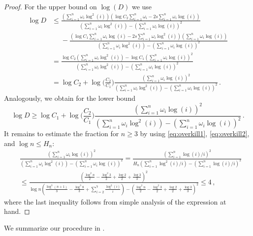 \documentclass[a4paper]{scrartcl}
\numberwithin{equation}{section}
\begin{document}
\begin{proof}
    For the upper bound on $\log(D)$ we use
    \begin{align*}
        \log D
        &\le \frac{(\sum_{i=1}^{n}\omega_i \log^2 (i))(\log C_2 \sum_{i=1}^{n}\omega_i-2s\sum_{i=1}^{n}\omega_i\log (i))}{(\sum_{i=1}^{n}\omega_i\log^2 (i))-(\sum_{i=1}^{n}\omega_i \log (i))^2} \\
        &\phantom\le - \frac{(\log C_1\sum_{i=1}^{n}\omega_i\log (i) - 2s\sum_{i=1}^{n}\omega_i\log^2 (i))(\sum_{i=1}^{n}\omega_i\log (i))}{(\sum_{i=1}^{n}\omega_i\log^2 (i))-(\sum_{i=1}^{n}\omega_i \log (i))^2} \\
        &= \frac{\log C_2 (\sum_{i=1}^{n}\omega_i\log^2 (i)) - \log C_1 (\sum_{i=1}^{n}\omega_i\log (i))^2}{(\sum_{i=1}^{n}\omega_i\log^2 (i))-(\sum_{i=1}^{n}\omega_i \log (i))^2} \\
        &= \log C_2 + \log\Big(\frac{C_2}{C_1}\Big) \frac{(\sum_{i=1}^{n}\omega_i \log (i))^2}{(\sum_{i=1}^{n}\omega_i\log^2 (i))-(\sum_{i=1}^{n}\omega_i \log (i))^2} \,.
    \end{align*}
    Analogously, we obtain for the lower bound
    \begin{equation*}
        \log D
        \ge
        \log C_1 + \log\Big(\frac{C_2}{C_1}\Big) \frac{(\sum_{i=1}^{n}\omega_i \log (i))^2}{(\sum_{i=1}^{n}\omega_i\log^2 (i))-(\sum_{i=1}^{n}\omega_i \log (i))^2} \,.
    \end{equation*}
    It remains to estimate the fraction for $n\ge 3$ by using \eqref{eq:overkill1}, \eqref{eq:overkill2}, and $\log n\le H_n$:
    \begin{align*}
        &\frac{(\sum_{i=1}^{n}\omega_i \log(i))^2}{(\sum_{i=1}^{n}\omega_i \log^2(i)) - (\sum_{i=1}^{n}\omega_i \log(i))^2}
        = \frac{(\sum_{i=1}^{n}\log(i)/i)^2}{H_n(\sum_{i=1}^{n} \log^2(i)/i) - (\sum_{i=1}^{n} \log(i)/i)^2} \\
        &\le \frac{(\frac{\log^2 n}{2} - \frac{\log^2 3}{2} + \frac{\log 2}{2} + \frac{\log 3}{3})^2}{\log n(\frac{\log^3 (n+1)}{3} - \frac{\log^3 8}{3} + \sum_{i=2}^{7}\frac{\log^2 (i)}{i}) - (\frac{\log^2 n}{2} - \frac{\log^2 3}{2} + \frac{\log 2}{2} + \frac{\log 3}{3})^2} 
        \le 4 \,,
    \end{align*}
    where the last inequality follows from simple analysis of the expression at hand.
\end{proof} 

We summarize our procedure in .
\end{document}
